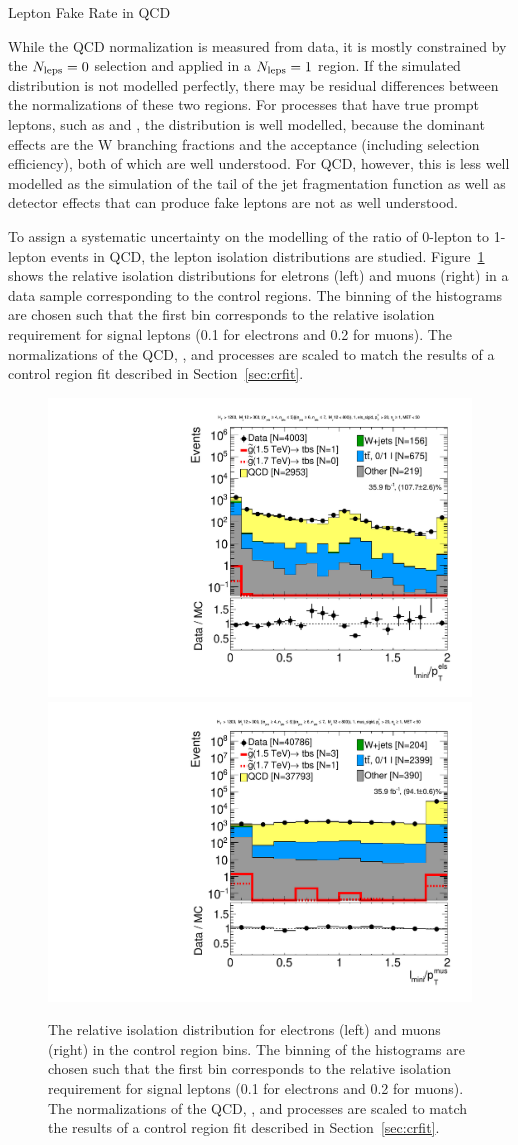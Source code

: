 \begin{section}{Lepton Fake Rate in QCD}

While the QCD normalization is measured from data, it is mostly constrained by the $N_{\mathrm{leps}} = 0$ selection and applied in a $N_{\mathrm{leps}} = 1$ region.
If the simulated \Nleps distribution is not modelled perfectly, there may be residual differences between the normalizations of these two regions.
For processes that have true prompt leptons, such as \ttbar and \Wjets, the \Nleps distribution is well modelled, because the dominant effects are the W branching fractions and the acceptance (including selection efficiency), both of which are well understood. 
For QCD, however, this is less well modelled as the simulation of the tail of the jet fragmentation function as well as detector effects that can produce fake leptons are not as well understood.

To assign a systematic uncertainty on the modelling of the ratio of 0-lepton to 1-lepton events in QCD, the lepton isolation distributions are studied.
Figure~\ref{fig:lep_iso} shows the relative isolation distributions for eletrons (left) and muons (right) in a data sample corresponding to the control regions.
The binning of the histograms are chosen such that the first bin corresponds to the relative isolation requirement for signal leptons (0.1 for electrons and 0.2 for muons).
The normalizations of the QCD, \ttbar, and \Wjets processes are scaled to match the results of a control region fit described in Section~\ref{sec:crfit}.

\begin{figure}[tbp!]
\begin{center}
\includegraphics[angle=0,width=0.45\columnwidth]{fig/iso_els.pdf}
\includegraphics[angle=0,width=0.45\columnwidth]{fig/iso_mus.pdf}
\end{center}
\caption{The relative isolation distribution for electrons (left) and muons (right) in the control region bins.
The binning of the histograms are chosen such that the first bin corresponds to the relative isolation requirement for signal leptons (0.1 for electrons and 0.2 for muons).
The normalizations of the QCD, \ttbar, and \Wjets processes are scaled to match the results of a control region fit described in Section~\ref{sec:crfit}.}
\label{fig:lep_iso}
\end{figure}


\end{section}
